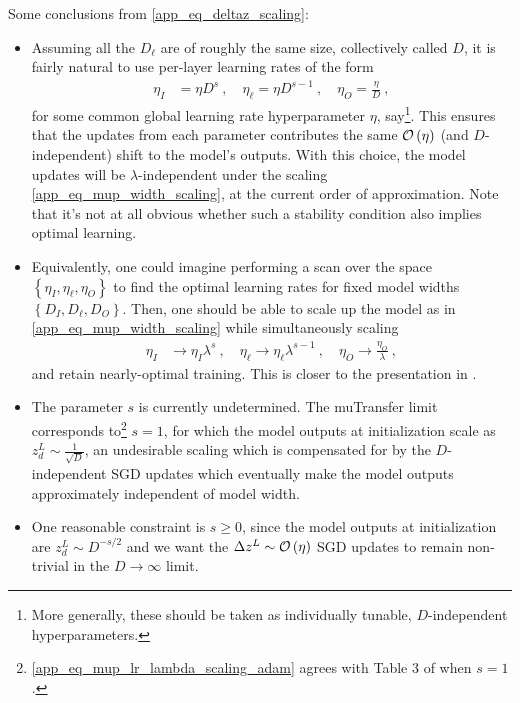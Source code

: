 Some conclusions from \eqref{app_eq_deltaz_scaling}:
\begin{itemize}
    \item Assuming all the $ D_{ \ell } $ are of roughly the same size, collectively called $ D $,
        it is fairly natural to use per-layer learning rates of the form
        \begin{align}
            \eta_{ I } &= \eta  D^{ s }\ ,\quad
            \eta_{ \ell } = \eta D^{ s-1 }\ , \quad
            \eta_{ O } =\frac{ \eta }{ D } \ , \label{app_eq_mup_lr_scaling_sgd}
        \end{align}
        for some common global learning rate hyperparameter $ \eta $, say\footnote{More generally,
        these should be taken as individually tunable, $ D $-independent hyperparameters.}. This
        ensures that the updates from each parameter contributes the same $ \mathcal{O} \left( \eta
        \right)  $ (and $ D $-independent) shift to the model's outputs. With this choice, the model
        updates will be $ \lambda $-independent under the scaling \eqref{app_eq_mup_width_scaling},
        at the current order of approximation. Note that it's not at all obvious whether such a
        stability condition also implies optimal learning.
    \item Equivalently, one could imagine performing a scan over the space $ \left \{ \eta_{ I },
        \eta_{ \ell }, \eta_{ O } \right \} $ to find the optimal learning rates for fixed model
        widths $ \left \{ D_{ I }, D_{ \ell }, D_{ O } \right \} $. Then, one should be able to
        scale up the model as in \eqref{app_eq_mup_width_scaling} while simultaneously scaling
        \begin{align}
            \eta_{ I } &\longrightarrow \eta_{ I }  \lambda^{ s }\ ,\quad
            \eta_{ \ell } \longrightarrow \eta_{ \ell } \lambda^{ s-1 }\ , \quad
            \eta_{ O } \longrightarrow\frac{ \eta_{ O } }{ \lambda } \ , \label{app_eq_mup_lr_lambda_scaling_sgd}
        \end{align}
        and retain nearly-optimal training. This is closer to the presentation in
        \cite{yang2022tensor}.
    \item The parameter $ s $ is currently undetermined. The muTransfer limit \cite{yang2022tensor}
        corresponds to\footnote{\eqref{app_eq_mup_lr_lambda_scaling_adam} agrees with  Table 3 of
        \cite{yang2022tensor} when $ s=1 $.} $ s=1 $, for which the model outputs at initialization
        scale as $ z^{ L }_{ d }\sim \frac{ 1 }{ \sqrt{D} }  $, an undesirable scaling which is
        compensated for by the $ D $-independent SGD updates which eventually make the model outputs
        approximately independent of model width.
    \item One reasonable constraint is $ s \ge 0 $, since the model outputs at initialization are $
        z^{ L }_{ d }\sim D^{-s/2 }  $ and we want the $ \Delta z^{ L }\sim \mathcal{O} \left( \eta
        \right)  $ SGD updates to remain non-trivial in the $ D\longrightarrow \infty $ limit.
\end{itemize}


